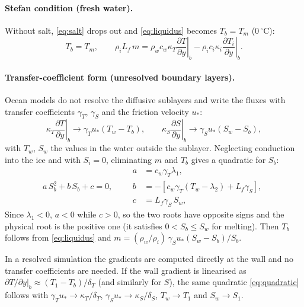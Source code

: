 \documentclass[11pt,a4paper]{article}
\begin{document}
\paragraph{Stefan condition (fresh water).} Without salt, \eqref{eq:salt} drops out and
\eqref{eq:liquidus} becomes $T_b = T_m$ (0\,$^\circ$C):
\begin{equation}
  T_b = T_m, \qquad
  \rho_i L_f\, m = \rho_w c_w \kappa_T \left.\frac{\partial T}{\partial y}\right|_b
  - \rho_i c_i \kappa_i \left.\frac{\partial T_i}{\partial y}\right|_b .
\end{equation}

\paragraph{Transfer-coefficient form (unresolved boundary layers).} Ocean models do not resolve the
diffusive sublayers and write the fluxes with transfer coefficients $\gamma_T$, $\gamma_S$ and the
friction velocity $u_*$:
\begin{equation}
  \kappa_T \left.\frac{\partial T}{\partial y}\right|_b \to \gamma_T u_* (T_w - T_b), \qquad
  \kappa_S \left.\frac{\partial S}{\partial y}\right|_b \to \gamma_S u_* (S_w - S_b),
\end{equation}
with $T_w$, $S_w$ the values in the water outside the sublayer. Neglecting conduction into the ice
and with $S_i=0$, eliminating $m$ and $T_b$ gives a quadratic for $S_b$:
\begin{equation}
  a\, S_b^2 + b\, S_b + c = 0, \qquad
  \begin{aligned}
    a &= c_w \gamma_T \lambda_1, \\
    b &= -\left[c_w \gamma_T (T_w - \lambda_2) + L_f \gamma_S\right], \\
    c &= L_f \gamma_S\, S_w ,
  \end{aligned}
  \label{eq:quadratic}
\end{equation}
Since $\lambda_1<0$, $a<0$ while $c>0$, so the two roots have opposite signs and the physical root is
the positive one (it satisfies $0 < S_b \le S_w$ for melting). Then $T_b$ follows from
\eqref{eq:liquidus} and $m = (\rho_w/\rho_i)\,\gamma_S u_* (S_w - S_b)/S_b$.

In a resolved simulation the gradients are computed directly at the wall and no transfer coefficients
are needed. If the wall gradient is linearised as
$\partial T/\partial y|_b \approx (T_1 - T_b)/\delta_T$ (and similarly for $S$), the same quadratic
\eqref{eq:quadratic} follows with $\gamma_T u_* \to \kappa_T/\delta_T$,
$\gamma_S u_* \to \kappa_S/\delta_S$, $T_w \to T_1$ and $S_w \to S_1$.
\end{document}
